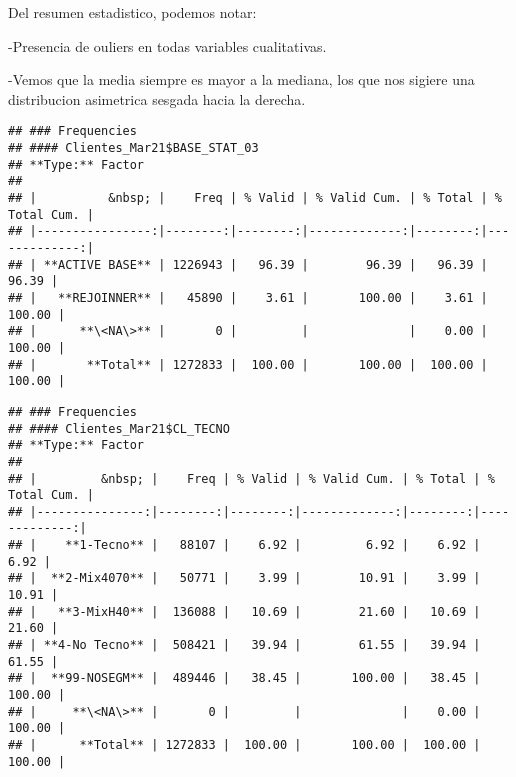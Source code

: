 \documentclass[
]{article}
\newenvironment{Shaded}{\begin{snugshade}}{\end{snugshade}}
\newcommand{\AttributeTok}[1]{\textcolor[rgb]{0.77,0.63,0.00}{#1}}
\newcommand{\ConstantTok}[1]{\textcolor[rgb]{0.00,0.00,0.00}{#1}}
\newcommand{\FunctionTok}[1]{\textcolor[rgb]{0.00,0.00,0.00}{#1}}
\newcommand{\NormalTok}[1]{#1}
\newcommand{\SpecialCharTok}[1]{\textcolor[rgb]{0.00,0.00,0.00}{#1}}
\newcommand{\StringTok}[1]{\textcolor[rgb]{0.31,0.60,0.02}{#1}}
\begin{document}
Del resumen estadistico, podemos notar:

-Presencia de ouliers en todas variables cualitativas.

-Vemos que la media siempre es mayor a la mediana, los que nos sigiere
una distribucion asimetrica sesgada hacia la derecha.

\begin{Shaded}
\end{Shaded}

\begin{verbatim}
## ### Frequencies  
## #### Clientes_Mar21$BASE_STAT_03  
## **Type:** Factor  
## 
## |          &nbsp; |    Freq | % Valid | % Valid Cum. | % Total | % Total Cum. |
## |----------------:|--------:|--------:|-------------:|--------:|-------------:|
## | **ACTIVE BASE** | 1226943 |   96.39 |        96.39 |   96.39 |        96.39 |
## |   **REJOINNER** |   45890 |    3.61 |       100.00 |    3.61 |       100.00 |
## |      **\<NA\>** |       0 |         |              |    0.00 |       100.00 |
## |       **Total** | 1272833 |  100.00 |       100.00 |  100.00 |       100.00 |
\end{verbatim}

\begin{Shaded}
\end{Shaded}

\begin{verbatim}
## ### Frequencies  
## #### Clientes_Mar21$CL_TECNO  
## **Type:** Factor  
## 
## |         &nbsp; |    Freq | % Valid | % Valid Cum. | % Total | % Total Cum. |
## |---------------:|--------:|--------:|-------------:|--------:|-------------:|
## |    **1-Tecno** |   88107 |    6.92 |         6.92 |    6.92 |         6.92 |
## |  **2-Mix4070** |   50771 |    3.99 |        10.91 |    3.99 |        10.91 |
## |   **3-MixH40** |  136088 |   10.69 |        21.60 |   10.69 |        21.60 |
## | **4-No Tecno** |  508421 |   39.94 |        61.55 |   39.94 |        61.55 |
## |  **99-NOSEGM** |  489446 |   38.45 |       100.00 |   38.45 |       100.00 |
## |     **\<NA\>** |       0 |         |              |    0.00 |       100.00 |
## |      **Total** | 1272833 |  100.00 |       100.00 |  100.00 |       100.00 |
\end{verbatim}
\end{document}
